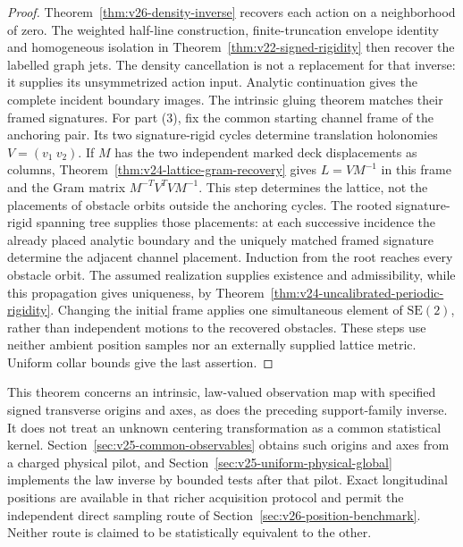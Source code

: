 \begin{proof}
Theorem~\ref{thm:v26-density-inverse} recovers each action on a neighborhood
of zero.  The weighted half-line construction, finite-truncation envelope
identity and homogeneous isolation in
Theorem~\ref{thm:v22-signed-rigidity} then recover the labelled graph jets.
The density cancellation is not a replacement for that inverse: it supplies
its unsymmetrized action input.  Analytic continuation gives the complete
incident boundary images.  The intrinsic gluing theorem matches their
framed signatures.  For part (3), fix the common starting channel frame of
the anchoring pair.  Its two signature-rigid cycles determine translation
holonomies \(V=(v_1\ v_2)\).  If \(M\) has the two independent marked deck
displacements as columns, Theorem~\ref{thm:v24-lattice-gram-recovery} gives
\(L=VM^{-1}\) in this frame and the Gram matrix
\(M^{-T}V^TVM^{-1}\).  This step determines the lattice, not the placements
of obstacle orbits outside the anchoring cycles.  The rooted
signature-rigid spanning tree supplies those placements: at each successive
incidence the already placed analytic boundary and the uniquely matched
framed signature determine the adjacent channel placement.  Induction from
the root reaches every obstacle orbit.  The assumed realization supplies
existence and admissibility, while this propagation gives uniqueness, by
Theorem~\ref{thm:v24-uncalibrated-periodic-rigidity}.  Changing the initial
frame applies one simultaneous element of \(\mathrm{SE}(2)\), rather than
independent motions to the recovered obstacles.  These steps use neither
ambient position samples nor an externally supplied lattice metric.
Uniform collar bounds give the last assertion.
\end{proof}

This theorem concerns an intrinsic, law-valued observation map with specified
signed transverse origins and axes, as does the preceding support-family
inverse.  It does not treat an unknown centering transformation as a common
statistical kernel.  Section~\ref{sec:v25-common-observables} obtains such
origins and axes from a charged physical pilot, and
Section~\ref{sec:v25-uniform-physical-global} implements the law inverse by
bounded tests after that pilot.  Exact longitudinal positions are available
in that richer acquisition protocol and permit the independent direct
sampling route of Section~\ref{sec:v26-position-benchmark}.  Neither route
is claimed to be statistically equivalent to the other.
